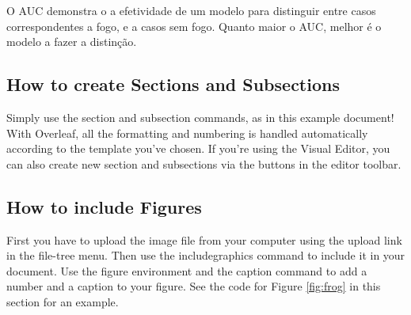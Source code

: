 \documentclass{article}
\begin{document}
O AUC demonstra o a efetividade de um modelo para distinguir entre casos correspondentes a fogo, e a casos sem fogo. Quanto maior o AUC, melhor é o modelo a fazer a distinção.





























































\subsection{How to create Sections and Subsections}

Simply use the section and subsection commands, as in this example document! With Overleaf, all the formatting and numbering is handled automatically according to the template you've chosen. If you're using the Visual Editor, you can also create new section and subsections via the buttons in the editor toolbar.

\subsection{How to include Figures}

First you have to upload the image file from your computer using the upload link in the file-tree menu. Then use the includegraphics command to include it in your document. Use the figure environment and the caption command to add a number and a caption to your figure. See the code for Figure \ref{fig:frog} in this section for an example.
\end{document}
